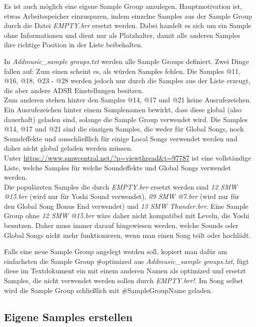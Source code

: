 Es ist auch möglich eine eigene Sample Group anzulegen. Hauptmotivation ist, etwas Arbeitsspeicher einzusparen, indem einzelne Samples aus der Sample Group durch die Datei \textit{EMPTY.brr} ersetzt werden. Dabei handelt es sich um ein Sample ohne Informationen und dient nur als Platzhalter, damit alle anderen Samples ihre richtige Position in der Liste beibehalten.

\bigskip

In \textit{Addmusic\_sample groups.txt} werden alle Sample Groups definiert. Zwei Dinge fallen auf: Zum einen scheint es, als würden Samples fehlen. Die Samples @11, @16, @18, @23 - @28 werden jedoch nur durch die Samples aus der Liste erzeugt, die aber andere ADSR Einstellungen besitzen. \\

Zum anderen stehen hinter den Samples @14, @17 und @21 keine Ausrufezeichen. Ein Ausrufezeichen hinter einem Samplenamen bewirkt, dass diese global (also dauerhaft) geladen sind, solange die Sample Group verwendet wird. Die Samples @14, @17 und @21 sind die einzigen Samples, die weder für Global Songs, noch Soundeffekte und ausschließlich für einige Local Songs verwendet werden und daher nicht global geladen werden müssen. \\
Unter \href{https://www.smwcentral.net/?p=viewthread\&t=97787}{https://www.smwcentral.net/?p=viewthread\&t=97787} ist eine vollständige Liste, welche Samples für welche Soundeffekte und Global Songs verwendet werden. \\
Die populärsten Samples die durch \textit{EMPTY.brr} ersetzt werden sind \textit{12 SMW @15.brr} (wird nur für Yoshi Sound verwendet), \textit{09 SMW @7.brr} (wird nur für den Global Song Bonus End verwendet) und \textit{13 SMW Thunder.brr}. Eine Sample Group ohne \textit{12 SMW @15.brr} wäre daher nicht kompatibel mit Leveln, die Yoshi benutzen. Daher muss immer darauf hingewiesen werden, welche Sounds oder Global Songs nicht mehr funktionieren, wenn man einen Song teilt oder hochlädt.

\bigskip

Falls eine neue Sample Group angelegt werden soll, kopiert man dafür am einfachsten die Sample Group \#optimized aus \textit{Addmusic\_sample groups.txt}, fügt diese im Textdokument ein mit einem anderen Namen als optimized und ersetzt Samples, die nicht verwendet werden sollen durch \textit{\dq EMPTY.brr\dq{}!}. Im Song selbst wird die Sample Group schließlich mit \#SampleGroupName geladen.

\subsection{Eigene Samples erstellen}


